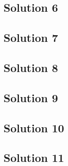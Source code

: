 \subsection{Solution 6}

\newpage

\subsection{Solution 7}

\newpage

\subsection{Solution 8}

\newpage

\subsection{Solution 9}

\newpage

\subsection{Solution 10}

\newpage

\subsection{Solution 11}

\newpage